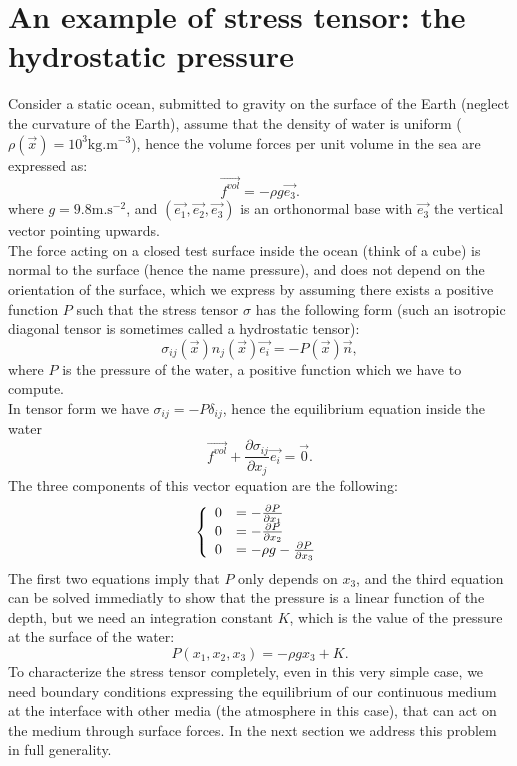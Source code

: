 \documentclass[DIV=12]{article}
\newcommand{\fVol}{\vec{f^{vol}}}
\newcommand{\eBase}{(\vec{e_1}, \vec{e_2},\vec{e_3})}
\newcommand{\kg}{\mathrm{kg}}
\newcommand{\m}{\mathrm{m}}
\newcommand{\s}{\mathrm{s}}
\begin{document}
 



\section{An example of stress tensor: the hydrostatic pressure}

Consider a static ocean, submitted to gravity on the surface of the 
 Earth (neglect the curvature of the Earth), assume that the density of water 
 is uniform ($\rho(\vec{x}) = 10^3  \kg.\m^{-3}$), hence the volume forces
 per unit volume in the sea are expressed as:
\begin{equation}
\fVol =-  \rho g \vec{e_3}.
\end{equation} 
where $g = 9.8 \m.\s^{-2}$, and $\eBase$ is an orthonormal base with $\vec{e_3}$ the vertical vector pointing
 upwards.\\

 The force acting on a closed test surface inside the ocean (think of a cube) is normal
 to the surface (hence the name pressure), and does not depend
 on the orientation of the surface, which we express by assuming there exists
 a positive function $P$ such that the stress tensor 
  $\sigma$  has the following form (such an isotropic diagonal tensor is sometimes called a hydrostatic
 tensor):\\
 \begin{equation}
 \sigma_{ij}(\vec{x}) n_j(\vec{x}) \vec{e_i} = -P(\vec{x}) \vec{n}, 
 \end{equation}
  where $P$ is the pressure of the water, a positive function which we have to compute.\\
 In tensor form we have $\sigma_{ij} = -P \delta_{ij}$,
 hence the equilibrium equation inside the water 
\begin{equation}
 \fVol + \frac{\partial \sigma_{ij}}{\partial x_j}\vec{e_i} = \vec{0}.
\end{equation}
 The three components of this vector equation are the following:
\[ 
 \left\{\begin{array}{l l }
0& =  - \frac{\partial P}{\partial x_1}\\
0 &= - \frac{\partial P}{\partial x_2}\\
0 & = -\rho g -\frac{\partial P}{\partial x_3}\\
\end{array}
\right.
\]
 The first two equations imply that $P$ only depends on $x_3$, and the third equation
 can be solved immediatly to show that the pressure is a linear 
 function of the depth, but we 
 need an integration constant $K$, which is the 
 value of the pressure at the surface of the water:
\begin{equation}
P(x_1,x_2,x_3 ) = -\rho g x_3 + K.
\end{equation} 
 To characterize the stress tensor completely, even in this very simple case,
 we need boundary conditions expressing the equilibrium of our continuous
 medium at the interface with other media (the atmosphere in this case),
 that can act on the medium through surface forces.
 In the next section we address this problem in full generality.
\end{document}
